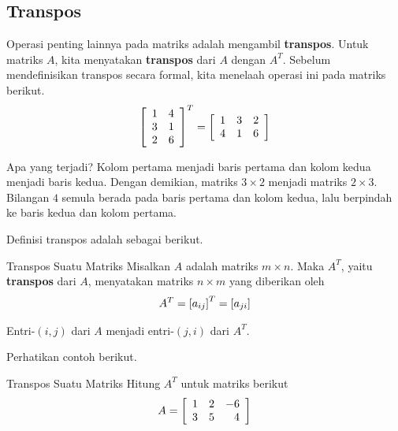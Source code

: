 \subsection{Transpos}

Operasi penting lainnya pada matriks adalah mengambil \textbf{transpos}. Untuk matriks $A$, kita menyatakan
\textbf{transpos} dari $A$ dengan $A^T$. Sebelum mendefinisikan transpos secara formal, kita menelaah
operasi ini pada matriks berikut.
\begin{equation*}
\left[
\begin{array}{cc}
1 & 4 \\
3 & 1 \\
2 & 6
\end{array}
\right] ^{T}=\allowbreak \left[
\begin{array}{ccc}
1 & 3 & 2 \\
4 & 1 & 6
\end{array}
\right]
\end{equation*}

Apa yang terjadi? Kolom pertama menjadi baris pertama dan kolom kedua
menjadi baris kedua. Dengan demikian, matriks $3\times 2$ menjadi matriks $2\times 3$.
Bilangan $4$ semula berada pada baris pertama dan kolom kedua, lalu
berpindah ke baris kedua dan kolom pertama. 

Definisi transpos adalah sebagai berikut.

\begin{definition}{Transpos Suatu Matriks}\label{def:matrixtranspose}
Misalkan $A$ adalah matriks $m\times n$. Maka $A^{T}$, yaitu \textbf{transpos}  dari $A$, menyatakan matriks $n\times m$
yang diberikan oleh
\begin{equation*}
A^{T} = \left[ a _{ij}\right] ^{T}= \left[ a_{ji} \right]
\end{equation*}
\end{definition}

Entri-$\left( i, j  \right)$ dari $A$ menjadi
entri-$\left( j,i \right)$ dari $A^T$. 

Perhatikan contoh berikut.

\begin{example}{Transpos Suatu Matriks}\label{exa:transposematrix}
Hitung $A^T$ untuk matriks berikut
\begin{equation*}
A = \left[
\begin{array}{rrr}
1 & 2 & -6 \\
3 & 5 & 4
\end{array}
\right]
\end{equation*}
\end{example}

